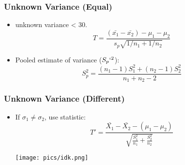 \documentclass[10pt, letterpaper, twoside]{article}
\newenvironment{Figure}
  {\par\medskip\noindent\minipage{\linewidth}}
  {\endminipage\par\medskip}
\begin{document}
\begin{multicols}{2}
\subsubsection{Unknown Variance (Equal)}

\begin{itemize}
    \item unknown variance < 30.
    \begin{equation*}
        T = \frac{(\bar{x_1} - \bar{x_2}) - \mu_1-\mu_2}{s_p\sqrt{1/n_1 + 1/n_2}}
    \end{equation*}
    \item Pooled estimate of variance ($S_p`^2$):
    \begin{equation*}
        S_p^2 = \frac{(n_1 - 1)S_1^2 + (n_2 - 1)S_2^2}{n_1 + n_2 - 2}
    \end{equation*}
\end{itemize}

\subsubsection{Unknown Variance (Different)}

\begin{itemize}
    \item If $\sigma_1 \neq \sigma_2$, use statistic:
    \begin{equation*}
        T' = \frac{\bar{X_1} - \bar{X_2} - (\mu_1 - \mu_2)}{\sqrt{\frac{S_1^2}{n_1}+ \frac{S_2^2}{n_2}}}
    \end{equation*}
    \begin{Figure}
        \texttt{[image: pics/idk.png]}
    \end{Figure}
\end{itemize}


\end{multicols}
\end{document}
